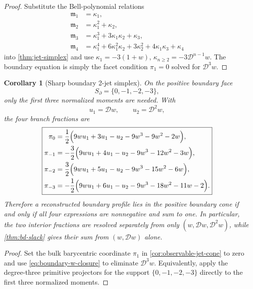\documentclass[aps,prd,reprint,onecolumn,nofootinbib,superscriptaddress,showkeys]{revtex4-2}
\numberwithin{equation}{section}
\theoremstyle{definition}
\theoremstyle{plain}
\newtheorem{corollary}{Corollary}[section]
\newcommand{\Dil}{\mathscr D}
\begin{document}
\begin{proof}
Substitute the Bell-polynomial relations
\begin{align*}
\mathfrak m_1&=\kappa_1,\\
\mathfrak m_2&=\kappa_1^2+\kappa_2,\\
\mathfrak m_3&=\kappa_1^3+3\kappa_1\kappa_2+\kappa_3,\\
\mathfrak m_4&=\kappa_1^4+6\kappa_1^2\kappa_2+3\kappa_2^2+4\kappa_1\kappa_3+\kappa_4
\end{align*}
into \cref{thm:jet-simplex} and use $\kappa_1=-3(1+w)$, $\kappa_{n\ge2}=-3\Dil^{n-1}w$.  The boundary equation is simply the facet condition $\pi_1=0$ solved for $\Dil^3w$.
\end{proof}

\begin{corollary}[Sharp boundary 2-jet simplex]\label{cor:boundary-jet-simplex}
On the positive boundary face
\[
S_\partial=\{0,-1,-2,-3\},
\]
only the first three normalized moments are needed.  With
\[
u_1=\Dil w,
\qquad
u_2=\Dil^2w,
\]
the four branch fractions are
\begin{equation}
\boxed{
\begin{aligned}
\pi_0
&=\frac12\Bigl(9wu_1+3u_1-u_2-9w^3-9w^2-2w\Bigr),\\
\pi_{-1}
&=-\frac32\Bigl(9wu_1+4u_1-u_2-9w^3-12w^2-3w\Bigr),\\
\pi_{-2}
&=\frac32\Bigl(9wu_1+5u_1-u_2-9w^3-15w^2-6w\Bigr),\\
\pi_{-3}
&=-\frac12\Bigl(9wu_1+6u_1-u_2-9w^3-18w^2-11w-2\Bigr).
\end{aligned}
}
\end{equation}
Therefore a reconstructed boundary profile lies in the positive boundary cone if and only if all four expressions are nonnegative and sum to one.  In particular, the two interior fractions are resolved separately from only $(w,\Dil w,\Dil^2w)$, while \cref{thm:bd-slack} gives their sum from $(w,\Dil w)$ alone.
\end{corollary}

\begin{proof}
Set the bulk barycentric coordinate $\pi_1$ in \cref{cor:observable-jet-cone} to zero and use \cref{eq:boundary-w-closure} to eliminate $\Dil^3w$.  Equivalently, apply the degree-three primitive projectors for the support $\{0,-1,-2,-3\}$ directly to the first three normalized moments.
\end{proof}
\end{document}

